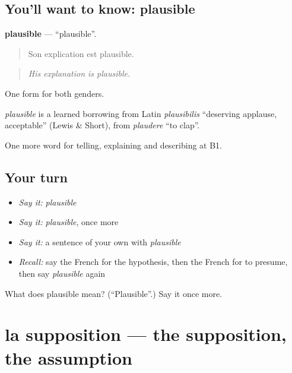 \subsection*{You'll want to know: plausible}
\textbf{plausible} — \textquotedblleft{}plausible\textquotedblright{}.

\begin{quote}
Son explication est plausible.
\end{quote}

\begin{quote}
\emph{His explanation is plausible.}
\end{quote}

One form for both genders.

\begin{cousinweb}
\emph{plausible} is a learned borrowing from Latin \emph{plausibilis} \textquotedblleft{}deserving applause, acceptable\textquotedblright{} (Lewis \& Short), from \emph{plaudere} \textquotedblleft{}to clap\textquotedblright{}.
\end{cousinweb}

\begin{grammarlens}[title={What you've built}]
One more word for telling, explaining and describing at B1.
\end{grammarlens}

\subsection*{Your turn}
\begin{itemize}
\raggedright
  \item \emph{Say it:} \emph{plausible}
  \item \emph{Say it:} \emph{plausible}, once more
  \item \emph{Say it:} a sentence of your own with \emph{plausible}
  \item \emph{Recall:} say the French for the hypothesis, then the French for to presume, then say \emph{plausible} again
\end{itemize}

\begin{tcolorbox}[breakable,colback=teal!4,colframe=teal!35!black,title={Before you move on}]
What does plausible mean? (\textquotedblleft{}Plausible\textquotedblright{}.) Say it once more.
\end{tcolorbox}
\section[la supposition]{la supposition — the supposition, the assumption}

